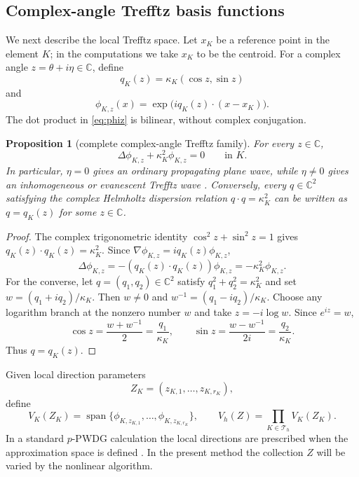 \documentclass[pdflatex,sn-mathphys-num]{sn-jnl}
\theoremstyle{thmstyleone}
\newtheorem{proposition}[theorem]{Proposition}
\theoremstyle{thmstyletwo}
\newcommand{\C}{\mathbb C}
\newcommand{\Th}{\mathcal T_h}
\begin{document}
\subsection{Complex-angle Trefftz basis functions}
We next describe the local Trefftz space.  Let $x_K$ be a reference point in the element $K$; in the computations we take $x_K$ to be the centroid.  For a complex angle $z=\theta+i\eta\in\C$, define
\begin{equation}\label{eq:qz}
 q_K(z)=\kappa_K(\cos z,\sin z)
\end{equation}
and
\begin{equation}\label{eq:phiz}
 \phi_{K,z}(x)=\exp\big(iq_K(z)\cdot(x-x_K)\big).
\end{equation}
The dot product in \eqref{eq:phiz} is bilinear, without complex conjugation.

\begin{proposition}[complete complex-angle Trefftz family]\label{prop:trefftz}
For every $z\in\C$,
\[
 \Delta\phi_{K,z}+\kappa_K^2\phi_{K,z}=0\qquad\text{in }K.
\]
In particular, $\eta=0$ gives an ordinary propagating plane wave, while $\eta\ne0$ gives an inhomogeneous or evanescent Trefftz wave \cite{ParolinHuybrechsMoiola2023}.  Conversely, every $q\in\C^2$ satisfying the complex Helmholtz dispersion relation $q\cdot q=\kappa_K^2$ can be written as $q=q_K(z)$ for some $z\in\C$.
\end{proposition}
\begin{proof}
The complex trigonometric identity $\cos^2z+\sin^2z=1$ gives $q_K(z)\cdot q_K(z)=\kappa_K^2$.  Since $\nabla\phi_{K,z}=iq_K(z)\phi_{K,z}$,
\[
 \Delta\phi_{K,z}=-(q_K(z)\cdot q_K(z))\phi_{K,z}=-\kappa_K^2\phi_{K,z}.
\]
For the converse, let $q=(q_1,q_2)\in\C^2$ satisfy $q_1^2+q_2^2=\kappa_K^2$ and set $w=(q_1+iq_2)/\kappa_K$.  Then $w\ne0$ and $w^{-1}=(q_1-iq_2)/\kappa_K$.  Choose any logarithm branch at the nonzero number $w$ and take $z=-i\log w$.  Since $e^{iz}=w$,
\[
 \cos z=\frac{w+w^{-1}}2=\frac{q_1}{\kappa_K},\qquad
 \sin z=\frac{w-w^{-1}}{2i}=\frac{q_2}{\kappa_K}.
\]
Thus $q=q_K(z)$.
\end{proof}

Given local direction parameters
\[
 Z_K=(z_{K,1},\ldots,z_{K,r_K}),
\]
define
\begin{equation}\label{eq:VKZ}
 V_K(Z_K)=\operatorname{span}\{\phi_{K,z_{K,1}},\ldots,\phi_{K,z_{K,r_K}}\},
 \qquad
 V_h(Z)=\prod_{K\in\Th}V_K(Z_K).
\end{equation}
In a standard $p$-PWDG calculation the local directions are prescribed when the approximation space is defined \cite{HiptmairMoiolaPerugia2011,HiptmairMoiolaPerugia2016}.  In the present method the collection $Z$ will be varied by the nonlinear algorithm.
\end{document}
